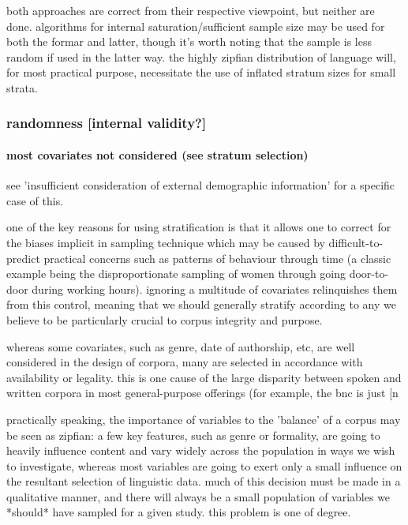 both approaches are correct from their respective viewpoint, but neither are done.  algorithms for internal saturation/sufficient sample size may be used for both the formar and latter, though it's worth noting that the sample is less random if used in the latter way.  the highly zipfian distribution of language will, for most practical purpose, necessitate the use of inflated stratum sizes for small strata.



\subsubsection{randomness [internal validity?]}

\paragraph{ most covariates not considered (see stratum selection)}
see 'insufficient consideration of external demographic information' for a specific case of this.  

one of the key reasons for using stratification is that it allows one to correct for the biases implicit in sampling technique which may be caused by difficult-to-predict practical concerns such as patterns of behaviour through time (a classic example being the disproportionate sampling of women through going door-to-door during working hours).  ignoring a multitude of covariates relinquishes them from this control, meaning that we should generally stratify according to any we believe to be particularly crucial to corpus integrity and purpose.

whereas some covariates, such as genre, date of authorship, etc, are well considered in the design of corpora, many are selected in accordance with availability or legality.  this is one cause of the large disparity between spoken and written corpora in most general-purpose offerings (for example, the bnc is just [n%

practically speaking, the importance of variables to the 'balance' of a corpus may be seen as zipfian: a few key features, such as genre or formality, are going to heavily influence content and vary widely across the population in ways we wish to investigate, whereas most variables are going to exert only a small influence on the resultant selection of linguistic data.  much of this decision must be made in a qualitative manner, and there will always be a small population of variables we *should* have sampled for a given study.  this problem is one of degree.



